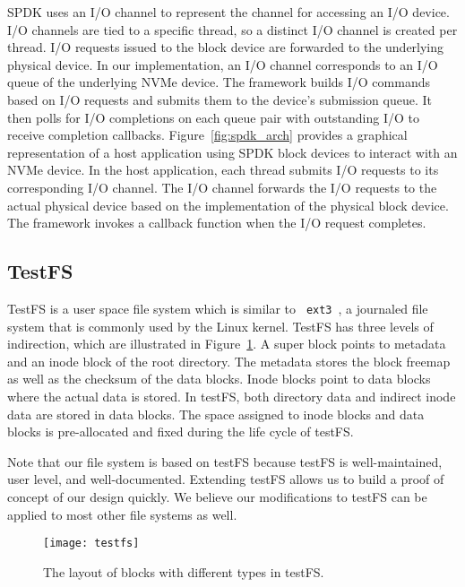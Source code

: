 SPDK uses an I/O channel to represent the channel for accessing an I/O device.
I/O channels are tied to a specific thread, so a distinct I/O channel is
created per thread. I/O requests issued to the block device are forwarded to
the underlying physical device. In our implementation, an I/O channel
corresponds to an I/O queue of the underlying NVMe device. The framework builds
I/O commands based on I/O requests and submits them to the device's submission
queue. It then polls for I/O completions on each queue pair with outstanding
I/O to receive completion callbacks. Figure~\ref{fig:spdk_arch} provides a
graphical representation of a host application using SPDK block devices to
interact with an NVMe device. In the host application, each thread submits I/O
requests to its corresponding I/O channel. The I/O channel forwards the I/O
requests to the actual physical device based on the implementation of the
physical block device. The framework invokes a callback function when the I/O
request completes.

\subsection{TestFS}

TestFS\cite{testfs} is a user space file system which is similar to {\tt
  ext3}~\cite{ext3}, a journaled file system that is commonly used by the Linux
kernel. TestFS has three levels of indirection, which are illustrated in
Figure~\ref{fig:testfs}. A super block points to metadata and an inode block of
the root directory. The metadata stores the block freemap as well as the
checksum of the data blocks. Inode blocks point to data blocks where the actual
data is stored. In testFS, both directory data and indirect inode data are
stored in data blocks. The space assigned to inode blocks and data blocks is
pre-allocated and fixed during the life cycle of testFS.

Note that our file system is based on testFS because testFS is well-maintained,
user level, and well-documented. Extending testFS allows us to build a proof of
concept of our design quickly. We believe our modifications to testFS can be
applied to most other file systems as well.

\begin{figure}[h!]
  \centering
  \texttt{[image: testfs]}
  \caption{The layout of blocks with different types in testFS.}
  \label{fig:testfs}
\end{figure}
